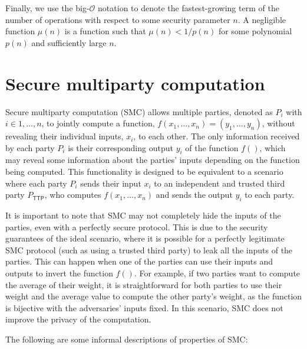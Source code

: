 Finally, we use the big-$\mathcal{O}$ notation to denote the fastest-growing term of the number of operations with respect to some security parameter $n$. A negligible function $\mu(n)$ is a function such that $\mu(n) < 1/p(n)$ for some polynomial $p(n)$ and sufficiently large $n$.



\section{Secure multiparty computation}

Secure multiparty computation (SMC) allows multiple parties, denoted as $P_i$ with $i \in {1,\ldots,n}$, to jointly compute a function, $f(x_1,\dots,x_n) = (y_1,\ldots,y_n)$, without revealing their individual inputs, $x_i$, to each other. The only information received by each party $P_i$ is their corresponding output $y_i$ of the function $f()$, which may reveal some information about the parties' inputs depending on the function being computed. This functionality is designed to be equivalent to a scenario where each party $P_i$ sends their input $x_i$ to an independent and trusted third party $P_{\mathsf{TTP}}$, who computes $f(x_1,\ldots,x_n)$ and sends the output $y_i$ to each party.

It is important to note that SMC may not completely hide the inputs of the parties, even with a perfectly secure protocol. This is due to the security guarantees of the ideal scenario, where it is possible for a perfectly legitimate SMC protocol (such as using a trusted third party) to leak all the inputs of the parties. This can happen when one of the parties can use their inputs and outputs to invert the function $f()$. For example, if two parties want to compute the average of their weight, it is straightforward for both parties to use their weight and the average value to compute the other party's weight, as the function is bijective with the adversaries' inputs fixed. In this scenario, SMC does not improve the privacy of the computation.
%

The following are some informal descriptions of properties of SMC:

